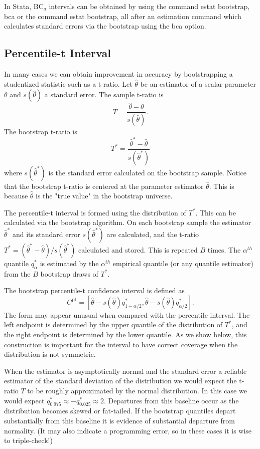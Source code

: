 \documentclass[10pt]{article}
\begin{document}
In Stata, $\mathrm{BC}_{a}$ intervals can be obtained by using the command estat bootstrap, bca or the command estat bootstrap, all after an estimation command which calculates standard errors via the bootstrap using the bca option.

\subsection{Percentile-t Interval}
In many cases we can obtain improvement in accuracy by bootstrapping a studentized statistic such as a t-ratio. Let $\widehat{\theta}$ be an estimator of a scalar parameter $\theta$ and $s(\widehat{\theta})$ a standard error. The sample t-ratio is
$$
T=\frac{\widehat{\theta}-\theta}{s(\widehat{\theta})} .
$$
The bootstrap t-ratio is
$$
T^{*}=\frac{\widehat{\theta}^{*}-\widehat{\theta}}{s\left(\widehat{\theta}^{*}\right)}
$$
where $s\left(\widehat{\theta}^{*}\right)$ is the standard error calculated on the bootstrap sample. Notice that the bootstrap t-ratio is centered at the parameter estimator $\widehat{\theta}$. This is because $\widehat{\theta}$ is the "true value" in the bootstrap universe.

The percentile-t interval is formed using the distribution of $T^{*}$. This can be calculated via the bootstrap algorithm. On each bootstrap sample the estimator $\widehat{\theta}^{*}$ and its standard error $s\left(\widehat{\theta}^{*}\right)$ are calculated, and the t-ratio $T^{*}=\left(\widehat{\theta}^{*}-\widehat{\theta}\right) / s\left(\widehat{\theta}^{*}\right)$ calculated and stored. This is repeated $B$ times. The $\alpha^{t h}$ quantile $q_{\alpha}^{*}$ is estimated by the $\alpha^{t h}$ empirical quantile (or any quantile estimator) from the $B$ bootstrap draws of $T^{*}$.

The bootstrap percentile-t confidence interval is defined as
$$
C^{\mathrm{pt}}=\left[\widehat{\theta}-s(\widehat{\theta}) q_{1-\alpha / 2}^{*}, \widehat{\theta}-s(\widehat{\theta}) q_{\alpha / 2}^{*}\right] .
$$
The form may appear unusual when compared with the percentile interval. The left endpoint is determined by the upper quantile of the distribution of $T^{*}$, and the right endpoint is determined by the lower quantile. As we show below, this construction is important for the interval to have correct coverage when the distribution is not symmetric.

When the estimator is asymptotically normal and the standard error a reliable estimator of the standard deviation of the distribution we would expect the t-ratio $T$ to be roughly approximated by the normal distribution. In this case we would expect $q_{0.975}^{*} \approx-q_{0.025}^{*} \approx 2$. Departures from this baseline occur as the distribution becomes skewed or fat-tailed. If the bootstrap quantiles depart substantially from this baseline it is evidence of substantial departure from normality. (It may also indicate a programming error, so in these cases it is wise to triple-check!)
\end{document}
